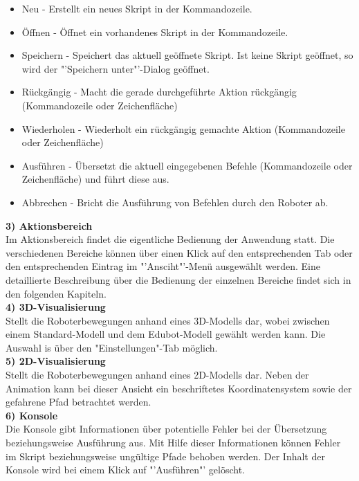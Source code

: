 \begin{itemize}
\item Neu - Erstellt ein neues Skript in der Kommandozeile.
\item Öffnen - Öffnet ein vorhandenes Skript in der Kommandozeile.
\item Speichern - Speichert das aktuell geöffnete Skript. Ist keine Skript geöffnet, so wird der "'Speichern unter"'-Dialog geöffnet.
\item Rückgängig - Macht die gerade durchgeführte Aktion rückgängig (Kommandozeile oder Zeichenfläche)
\item Wiederholen - Wiederholt ein rückgängig gemachte Aktion  (Kommandozeile oder Zeichenfläche)
\item Ausführen - Übersetzt die aktuell eingegebenen Befehle (Kommandozeile oder Zeichenfläche) und führt diese aus.
\item Abbrechen - Bricht die Ausführung von Befehlen durch den Roboter ab.
\end{itemize}
\textbf{3) Aktionsbereich}\\
Im Aktionsbereich findet die eigentliche Bedienung der Anwendung statt. Die verschiedenen Bereiche können über einen Klick auf den entsprechenden Tab oder den entsprechenden Eintrag im "'Ansciht"'-Menü ausgewählt werden. Eine detaillierte Beschreibung über die Bedienung der einzelnen Bereiche findet sich in den folgenden Kapiteln.\\
\textbf{4) 3D-Visualisierung}\\
Stellt die Roboterbewegungen anhand eines 3D-Modells dar, wobei zwischen einem Standard-Modell und dem Edubot-Modell gewählt werden kann. Die Auswahl is über den "Einstellungen"-Tab möglich.\\
\textbf{5) 2D-Visualisierung}\\
Stellt die Roboterbewegungen anhand eines 2D-Modells dar. Neben der Animation kann bei dieser Ansicht ein beschriftetes Koordinatensystem sowie der gefahrene Pfad betrachtet werden.\\
\textbf{6) Konsole}\\
Die Konsole gibt Informationen über potentielle Fehler bei  der Übersetzung beziehungsweise Ausführung aus. Mit Hilfe dieser Informationen können Fehler im Skript beziehungsweise ungültige Pfade behoben werden. Der Inhalt der Konsole wird bei einem Klick auf "'Ausführen"' gelöscht.
